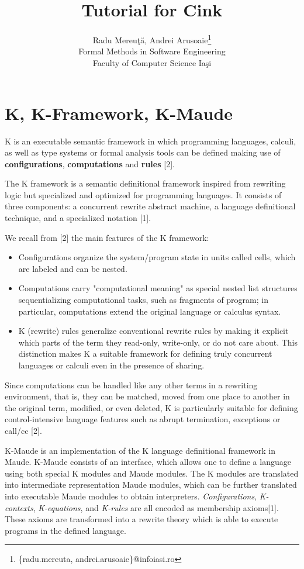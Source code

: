 \documentclass[11pt,a4paper]{article}
\title{Tutorial for {\bf Cink}}
\author{Radu Mereu\c{t}\u{a}, Andrei Arusoaie\thanks{\{radu.mereuta, andrei.arusoaie\}@infoiasi.ro} \\ Formal Methods in Software Engineering \\ Faculty of Computer Science Ia\c{s}i}
\begin{document}
\maketitle


\tableofcontents


\section{K, K-Framework, K-Maude}
\noindent K is an executable semantic framework in which programming languages, calculi, as well as type systems or formal analysis tools can be defined making use of {\bf configurations}, {\bf computations} and {\bf rules} [2]. 

\noindent The K framework is a semantic definitional framework inspired from rewriting logic but specialized and optimized for programming languages. It consists of three components: a concurrent rewrite abstract machine, a language deﬁnitional technique, and a specialized notation [1].

\noindent We recall from [2] the main features of the K framework:

\begin{itemize}
\item Configurations organize the system/program state in units called cells, which are labeled and can be nested. 

\item Computations carry "computational meaning" as special nested list structures sequentializing computational tasks, such as fragments of program; in particular, computations extend the original language or calculus syntax. 

\item K (rewrite) rules generalize conventional rewrite rules by making it explicit which parts of the term they read-only, write-only, or do not care about. This distinction makes K a suitable framework for defining truly concurrent languages or calculi even in the presence of sharing. 

\end{itemize}

\noindent Since computations can be handled like any other terms in a rewriting environment, that is, they can be matched, moved from one place to another in the original term, modified, or even deleted, K is particularly suitable for defining control-intensive language features such as abrupt termination, exceptions or call/cc [2].

\noindent K-Maude is an implementation of the K language deﬁnitional framework in Maude. K-Maude consists of an interface, which allows one to deﬁne a language using both special K modules and Maude modules. The K modules are translated into intermediate representation Maude modules, which can be further translated into executable Maude modules to obtain interpreters. \textit{Conﬁgurations}, \textit{K-contexts}, \textit{K-equations}, and \textit{K-rules} are all encoded as membership axioms[1]. These axioms are transformed into a rewrite theory which is able to execute programs in the defined language.
\end{document}
